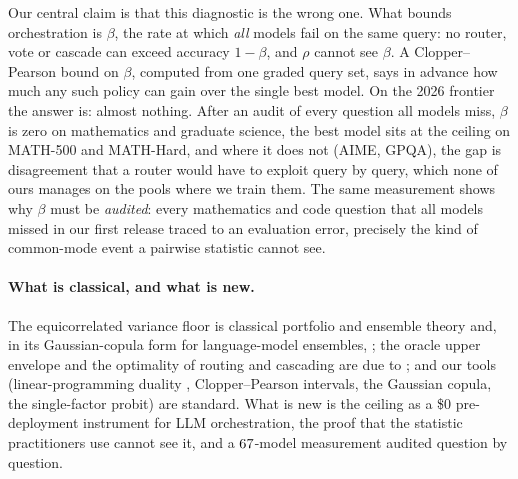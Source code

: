 \documentclass[11pt]{article}
\theoremstyle{plain}
\theoremstyle{definition}
\begin{document}
Our central claim is that this diagnostic is the wrong one. What bounds orchestration is $\beta$, the rate at which
\emph{all} models fail on the same query: no router, vote or cascade can exceed accuracy $1-\beta$, and $\rho$ cannot see
$\beta$. A Clopper--Pearson bound on $\beta$, computed from one graded query set, says in advance how much any such policy
can gain over the single best model. On the 2026 frontier the answer is: almost nothing. After an audit of every question
all models miss, $\beta$ is zero on mathematics and graduate science, the best model sits at the ceiling on MATH-500 and
MATH-Hard, and where it does not (AIME, GPQA), the gap is disagreement that a router would have to exploit query by query, which none of
ours manages on the pools where we train them. The same
measurement shows why $\beta$ must be \emph{audited}: every mathematics and code question that all models missed in our first
release traced to an evaluation error, precisely the kind of common-mode event a pairwise statistic cannot see.

\paragraph{What is classical, and what is new.} The equicorrelated variance floor is classical portfolio and ensemble theory
\citep{markowitz1952,statman1987,krogh1995ensemble,ueda1996,wood2023diversity} and, in its Gaussian-copula form for
language-model ensembles, \citet{turkmen2026ensembleselection}; the oracle upper envelope and the optimality of routing
and cascading are due to \citet{dekoninck2024cascaderouting}; and our tools (linear-programming duality
\citep{bertsimas1997lp}, Clopper--Pearson intervals, the Gaussian copula, the single-factor probit) are standard. What is
new is the ceiling as a \$0 pre-deployment instrument for LLM orchestration, the proof that the statistic practitioners use
cannot see it, and a $67$-model measurement audited question by question.
\end{document}
